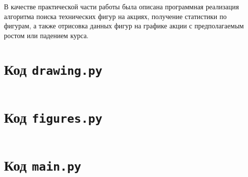 \documentclass[bachelor, och, coursework]{SCWorks}
\begin{document}
    В качестве практической части работы была описана программная реализация
    алгоритма поиска технических фигур на акциях, получение статистики по
    фигурам, а также отрисовка данных фигур на графике акции с предполагаемым
    ростом или падением курса.


    
    

\appendix
    \section{Код \texttt{drawing.py}}
    \inputminted{py}{code/drawing.py}

    \section{Код \texttt{figures.py}}
    \inputminted{py}{code/figures.py}

    \section{Код \texttt{main.py}}
    \inputminted{py}{code/main.py}
\end{document}

